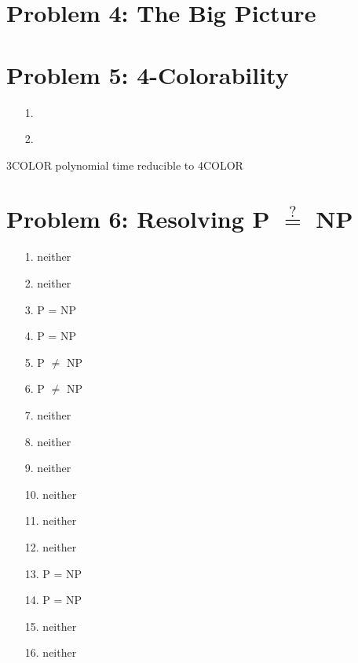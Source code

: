 \documentclass[10pt,letter]{article}
\begin{document}
\section*{Problem 4: The Big Picture}

\section*{Problem 5: 4-Colorability}
\begin{enumerate}
\item[1.]
\item[2.]
\end{enumerate}
3COLOR polynomial time reducible to 4COLOR
\section*{Problem 6: Resolving P $\stackrel{?}{=}$ NP}

\begin{enumerate}
\item[1.] neither
\item[2.] neither
\item[3.] P = NP
\item[4.] P = NP
\item[5.] P $\neq$ NP
\item[6.] P $\neq$ NP
\item[7.] neither
\item[8.] neither
\item[9.] neither
\item[10.] neither
\item[11.] neither
\item[12.] neither
\item[13.] P = NP
\item[14.] P = NP
\item[15.] neither
\item[16.] neither
\end{enumerate}
\end{document}
